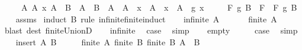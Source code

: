 \begin{isabellebody}
\ \ \ \ \ {\isachardoublequoteopen}{\isasymAnd}A{}\ A{}\ x{\isachardot}{\kern0pt}\ A{}\ {\isasymin}\ B\ {\isasymLongrightarrow}\ A{}\ {\isasymin}\ B\ {\isasymLongrightarrow}\ A{}\ {\isasymnoteq}\ A{}\ {\isasymLongrightarrow}\ x\ {\isasymin}\ A{}\ {\isasymLongrightarrow}\ x\ {\isasymin}\ A{}\ {\isasymLongrightarrow}\ g\ x\ {\isacharequal}{\kern0pt}\ \isanewline
\ \ \ {\isachardoublequoteopen}F\ g\ {\isacharparenleft}{\kern0pt}{\isasymUnion}B{\isacharparenright}{\kern0pt}\ {\isacharequal}{\kern0pt}\ {\isacharparenleft}{\kern0pt}F\ {\isasymcirc}\ F{\isacharparenright}{\kern0pt}\ g\ B{\isachardoublequoteclose}\isanewline
%
\isadelimproof
\ \ %
\endisadelimproof
%
\isatagproof
{}\isamarkupfalse%
\ assms\isanewline
{}\isamarkupfalse%
\ {\isacharparenleft}{\kern0pt}induct\ B\ rule{\isacharcolon}{\kern0pt}\ infinite{\isacharunderscore}{\kern0pt}finite{\isacharunderscore}{\kern0pt}induct{\isacharparenright}{\kern0pt}\isanewline
\ \ \isamarkupfalse%
\ {\isacharparenleft}{\kern0pt}infinite\ A{\isacharparenright}{\kern0pt}\isanewline
\ \ \isamarkupfalse%
\ \isamarkupfalse%
\ {\isachardoublequoteopen}{\isasymnot}\ finite\ {\isacharparenleft}{\kern0pt}{\isasymUnion}A{\isacharparenright}{\kern0pt}{\isachardoublequoteclose}\ \isamarkupfalse%
\ {\isacharparenleft}{\kern0pt}blast\ dest{\isacharcolon}{\kern0pt}\ finite{\isacharunderscore}{\kern0pt}UnionD{\isacharparenright}{\kern0pt}\isanewline
\ \ \isamarkupfalse%
\ infinite\ \isamarkupfalse%
\ {\isacharquery}{\kern0pt}case\ \isamarkupfalse%
\ simp\isanewline
{}\isamarkupfalse%
\isanewline
\ \ \isamarkupfalse%
\ empty\isanewline
\ \ \isamarkupfalse%
\ \isamarkupfalse%
\ {\isacharquery}{\kern0pt}case\ \isamarkupfalse%
\ simp\isanewline
{}\isamarkupfalse%
\isanewline
\ \ \isamarkupfalse%
\ {\isacharparenleft}{\kern0pt}insert\ A\ B{\isacharparenright}{\kern0pt}\isanewline
\ \ \isamarkupfalse%
\ \isamarkupfalse%
\ {\isachardoublequoteopen}finite\ A{\isachardoublequoteclose}\ {\isachardoublequoteopen}finite\ B{\isachardoublequoteclose}\ {\isachardoublequoteopen}finite\ {\isacharparenleft}{\kern0pt}{\isasymUnion}B{\isacharparenright}{\kern0pt}{\isachardoublequoteclose}\ {\isachardoublequoteopen}A\ {\isasymnotin}\ B{\isachardoublequoteclose}\isanewline

\end{isabellebody}
